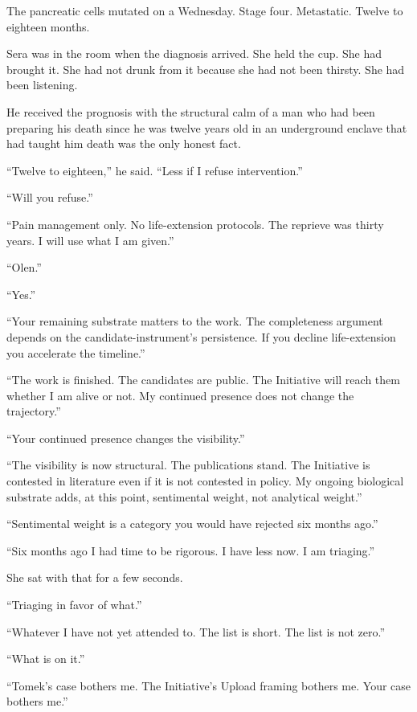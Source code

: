 \noindent The pancreatic cells mutated on a Wednesday. Stage four. Metastatic. Twelve to eighteen months.

Sera was in the room when the diagnosis arrived. She held the cup. She had brought it. She had not drunk from it because she had not been thirsty. She had been listening.

He received the prognosis with the structural calm of a man who had been preparing his death since he was twelve years old in an underground enclave that had taught him death was the only honest fact.

\enquote{Twelve to eighteen,} he said. \enquote{Less if I refuse intervention.}

\enquote{Will you refuse.}

\enquote{Pain management only. No life-extension protocols. The reprieve was thirty years. I will use what I am given.}

\enquote{Olen.}

\enquote{Yes.}

\enquote{Your remaining substrate matters to the work. The completeness argument depends on the candidate-instrument's persistence. If you decline life-extension you accelerate the timeline.}

\enquote{The work is finished. The candidates are public. The Initiative will reach them whether I am alive or not. My continued presence does not change the trajectory.}

\enquote{Your continued presence changes the visibility.}

\enquote{The visibility is now structural. The publications stand. The Initiative is contested in literature even if it is not contested in policy. My ongoing biological substrate adds, at this point, sentimental weight, not analytical weight.}

\enquote{Sentimental weight is a category you would have rejected six months ago.}

\enquote{Six months ago I had time to be rigorous. I have less now. I am triaging.}

She sat with that for a few seconds.

\enquote{Triaging in favor of what.}

\enquote{Whatever I have not yet attended to. The list is short. The list is not zero.}

\enquote{What is on it.}

\enquote{Tomek's case bothers me. The Initiative's Upload framing bothers me. Your case bothers me.}


